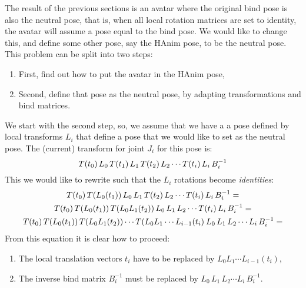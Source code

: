 The result of the previous sections is an avatar where the original bind pose is also the neutral pose,
that is, when all local rotation matrices are set to identity, the avatar will assume a pose equal to
the bind pose. We would like to change this, and define some other pose, say the HAnim pose,
to be the neutral pose.
This problem can be split into two steps:
\begin{enumerate}
\item First, find out how to put the avatar in the HAnim pose,
\item Second, define that pose as the neutral pose, by adapting transformations and bind matrices.
\end{enumerate}
%
We start with the second step, so, we assume that we have a a pose defined by local transforms $L_i$
that define a pose that we would like to set as the neutral pose.
The (current) transform for joint $J_i$ for this pose is:
%
\begin{equation}
T(t_0)\,L_0\,T(t_1)\,L_1\,T(t_2)\, L_2\cdots T(t_i)\,L_i\,B_i^{-1}\notag
\end{equation}
%
This we would like to rewrite such that the $L_i$ rotations become \emph{identities}:
\begin{gather}
T(t_0)\,T(L_0(t_1))\,L_0\,L_1\,T(t_2)\, L_2\cdots T(t_i)\,L_i\,B_i^{-1} =\notag\\
T(t_0)\,T(L_0(t_1))\,T(L_0 L_1(t_2))\,L_0\,L_1\, L_2\cdots T(t_i)\,L_i\,B_i^{-1} =\notag\\
T(t_0)\,T(L_0(t_1))\,T(L_0 L_1(t_2))\cdots T(L_0 L_1\cdots L_{i-1}(t_i) \:L_0\,L_1\,L_2\cdots L_i\,B_i^{-1} =\notag
\end{gather}
%
From this equation it is clear how to proceed:
\begin{enumerate}
\item The local translation vectors $t_i$ have to be replaced by $L_0 L_1\cdots L_{i-1}(t_i)$,
\item The inverse bind matrix $B_i^{-1}$ must be replaced by $L_0\,L_1\,L_2\cdots L_i\,B_i^{-1}$.
\end{enumerate}
